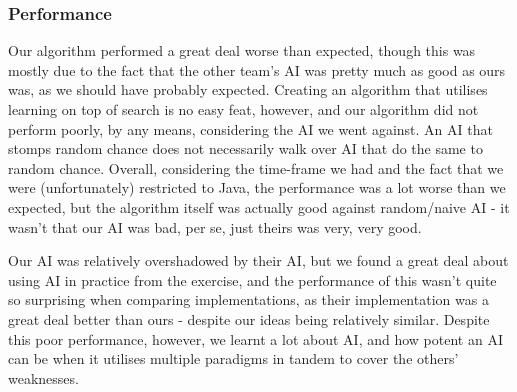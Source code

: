 \documentclass[11pt]{article}
\begin{document}
\subsubsection{Performance}
\label{sec-3-3-2}

Our algorithm performed a great deal worse than expected, though this was mostly due to the fact that the other team's AI was pretty much as good as ours was, as we should have probably expected. Creating an algorithm that utilises learning on top of search is no easy feat, however, and our algorithm did not perform poorly, by any means, considering the AI we went against. An AI that stomps random chance does not necessarily walk over AI that do the same to random chance. Overall, considering the time-frame we had and the fact that we were (unfortunately) restricted to Java, the performance was a lot worse than we expected, but the algorithm itself was actually good against random/naive AI - it wasn't that our AI was bad, per se, just theirs was very, very good.

Our AI was relatively overshadowed by their AI, but we found a great deal about using AI in practice from the exercise, and the performance of this wasn't quite so surprising when comparing implementations, as their implementation was a great deal better than ours - despite our ideas being relatively similar. Despite this poor performance, however, we learnt a lot about AI, and how potent an AI can be when it utilises multiple paradigms in tandem to cover the others' weaknesses.
\end{document}
